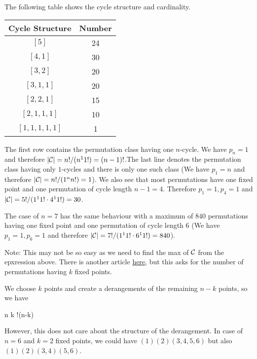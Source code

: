 The following table shows the cycle structure and cardinality.

\vspace{2mm}

\begin{tabular}{cc}
    Cycle Structure & Number \\ \hline
    $[5]$ &  24 \\
    $[4, 1]$ & 30 \\
    $[3, 2]$ & 20 \\
    $[3, 1, 1]$ & 20 \\
    $[2, 2, 1]$ & 15 \\
    $[2, 1, 1, 1]$ & 10 \\
    $[1, 1, 1, 1, 1]$ & 1
\end{tabular}

\vspace{2mm}

The first row contains the permutation class having one $n$-cycle. We have $p_n=1$ and therefore $|\mathcal{C}| = n!/(n^1 1!) = (n-1)!$.The last line denotes the permutation class having only $1$-cycles and there is only one such class (We have $p_1=n$ and therefore $|\mathcal{C}| = n!/(1^n n!) = 1$). We also see that most permutations have one fixed point and one permutation of cycle length $n-1=4$. Therefore $p_1=1, p_{4}=1$ and $|\mathcal{C}| = 5!/(1^1 1! \cdot 4^1 1! ) = 30$.

The case of $n=7$ has the same behaviour with a maximum of $840$ permutations having one fixed point and one permutation of cycle length $6$ (We have $p_1=1, p_6=1$ and therefore $|\mathcal{C}| = 7!/(1^1 1! \cdot 6^1 1!) = 840$).

Note: This may not be so easy as we need to find the max of $\mathcal{C}$ from the epxression above. There is another article \href{https://math.ucr.edu/home/baez/permutations/permutations_1.html}{here}, but this asks for the number of permutations having $k$ fixed points.

We choose $k$ points and create a derangements of the remaining $n-k$ points, so we have

\bee
{n \choose k} !(n-k)
\eee

However, this does not care about the structure of the derangement. In case of $n=6$ and $k=2$ fixed points, we could have $(1)(2)(3,4,5,6)$ but also $(1)(2)(3,4)(5,6)$.


